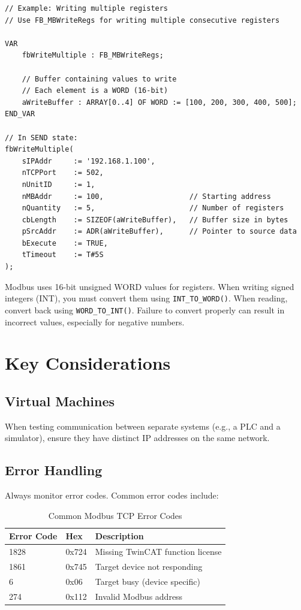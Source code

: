 \documentclass[11pt,a4paper]{article}
\begin{document}
\begin{lstlisting}
// Example: Writing multiple registers
// Use FB_MBWriteRegs for writing multiple consecutive registers

VAR
    fbWriteMultiple : FB_MBWriteRegs;
    
    // Buffer containing values to write
    // Each element is a WORD (16-bit)
    aWriteBuffer : ARRAY[0..4] OF WORD := [100, 200, 300, 400, 500];
END_VAR

// In SEND state:
fbWriteMultiple(
    sIPAddr     := '192.168.1.100',
    nTCPPort    := 502,
    nUnitID     := 1,
    nMBAddr     := 100,                    // Starting address
    nQuantity   := 5,                      // Number of registers
    cbLength    := SIZEOF(aWriteBuffer),   // Buffer size in bytes
    pSrcAddr    := ADR(aWriteBuffer),      // Pointer to source data
    bExecute    := TRUE,
    tTimeout    := T#5S
);
\end{lstlisting}

\begin{warningbox}
Modbus uses 16-bit unsigned WORD values for registers. When writing signed integers (INT), you must convert them using \texttt{INT\_TO\_WORD()}. When reading, convert back using \texttt{WORD\_TO\_INT()}. Failure to convert properly can result in incorrect values, especially for negative numbers.
\end{warningbox}

\section{Key Considerations}

\subsection{Virtual Machines}
When testing communication between separate systems (e.g., a PLC and a simulator), ensure they have distinct IP addresses on the same network.

\subsection{Error Handling}
Always monitor error codes. Common error codes include:

\begin{table}[h]
\centering
\begin{tabular}{@{}lll@{}}
\toprule
\textbf{Error Code} & \textbf{Hex} & \textbf{Description} \\
\midrule
1828 & 0x724 & Missing TwinCAT function license \\
1861 & 0x745 & Target device not responding \\
6 & 0x06 & Target busy (device specific) \\
274 & 0x112 & Invalid Modbus address \\
\bottomrule
\end{tabular}
\caption{Common Modbus TCP Error Codes}
\end{table}
\end{document}
